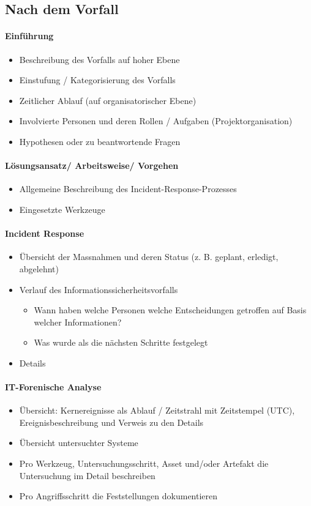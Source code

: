 \subsection{Nach dem Vorfall}
\paragraph{Einführung}
\begin{itemize}
    \item Beschreibung des Vorfalls auf hoher Ebene
    \item Einstufung / Kategorisierung des Vorfalls
    \item Zeitlicher Ablauf (auf organisatorischer Ebene)
    \item Involvierte Personen und deren Rollen / Aufgaben (Projektorganisation)
    \item Hypothesen oder zu beantwortende Fragen
\end{itemize}

\paragraph{Lösungsansatz/ Arbeitsweise/ Vorgehen}
\begin{itemize}
    \item Allgemeine Beschreibung des Incident-Response-Prozesses
    \item Eingesetzte Werkzeuge
\end{itemize}

\paragraph{Incident Response}
\begin{itemize}
    \item Übersicht der Massnahmen und deren Status (z. B. geplant, erledigt, abgelehnt)
    \item Verlauf des Informationssicherheitsvorfalls
    \begin{itemize}
        \item Wann haben welche Personen welche Entscheidungen getroffen auf Basis welcher Informationen?
        \item Was wurde als die nächsten Schritte festgelegt
    \end{itemize}
    \item Details
\end{itemize}

\paragraph{IT-Forenische Analyse}
\begin{itemize}
    \item Übersicht: Kernereignisse als Ablauf / Zeitstrahl mit Zeitstempel (UTC), Ereignisbeschreibung und Verweis zu den Details
    \item Übersicht untersuchter Systeme
    \item Pro Werkzeug, Untersuchungsschritt, Asset und/oder Artefakt die Untersuchung im Detail beschreiben
    \item Pro Angriffsschritt die Feststellungen dokumentieren
\end{itemize}

